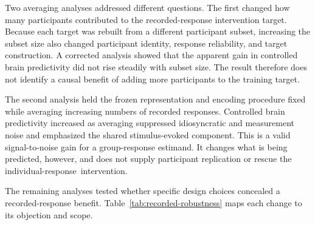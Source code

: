 Two averaging analyses addressed different questions.
The first changed how many participants contributed to the recorded-response intervention target.
Because each target was rebuilt from a different participant subset, increasing the subset size also changed participant identity, response reliability, and target construction.
A corrected analysis showed that the apparent gain in controlled brain predictivity did not rise steadily with subset size.
The result therefore does not identify a causal benefit of adding more participants to the training target. 

 The second analysis held the frozen representation and encoding procedure fixed while averaging increasing numbers of recorded responses.
Controlled brain predictivity increased as averaging suppressed idiosyncratic and measurement noise and emphasized the shared stimulus-evoked component.
This is a valid signal-to-noise gain for a group-response estimand.
It changes what is being predicted, however, and does not supply participant replication or rescue the individual-response~\mbox{intervention}. 

The remaining analyses tested whether specific design choices concealed a recorded-response benefit.
Table~\ref{tab:recorded-robustness} maps each change to its objection and scope.

